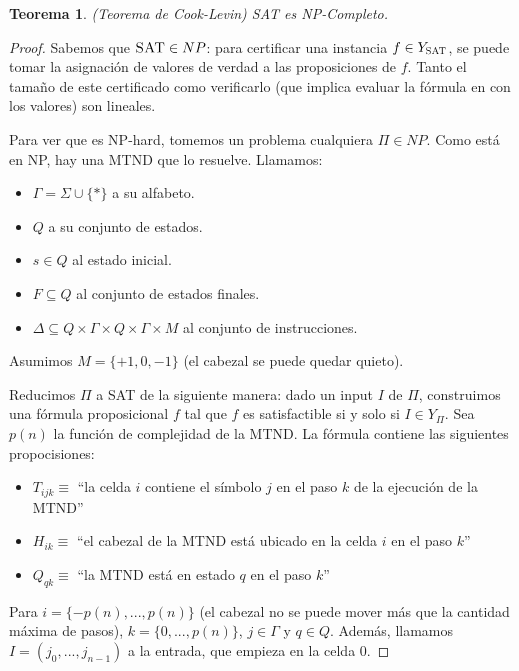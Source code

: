 \documentclass[a4paper]{report}
\newtheorem*{theorem*}{Teorema}
\begin{document}
\begin{theorem*}
    (Teorema de Cook-Levin) SAT es NP-Completo.
\end{theorem*}
\begin{proof}
    Sabemos que $\textsc{SAT} \in NP$: para certificar una instancia $f \in Y_{\textsc{SAT}}$, se puede tomar la asignación de valores de verdad a las proposiciones de $f$. Tanto el tamaño de este certificado como verificarlo (que implica evaluar la fórmula en con los valores) son lineales.

    Para ver que es NP-hard, tomemos un problema cualquiera $\Pi \in NP$. Como está en NP, hay una MTND que lo resuelve. Llamamos:
    \begin{itemize}
        \item $\Gamma = \Sigma \cup \{\ast\}$ a su alfabeto.
        \item $Q$ a su conjunto de estados.
        \item $s \in Q$ al estado inicial.
        \item $F \subseteq Q$ al conjunto de estados finales.
        \item $\Delta \subseteq Q \times \Gamma \times Q \times \Gamma \times M$ al conjunto de instrucciones.
    \end{itemize}

    Asumimos $M = \{+1, 0, -1\}$ (el cabezal se puede quedar quieto).

    Reducimos $\Pi$ a SAT de la siguiente manera: dado un input $I$ de $\Pi$, construimos una fórmula proposicional $f$ tal que $f$ es satisfactible si y solo si $I \in Y_{\Pi}$. Sea $p(n)$ la función de complejidad de la MTND. La fórmula contiene las siguientes propocisiones:
    \begin{itemize}
        \item $T_{ijk} \equiv $ ``la celda $i$ contiene el símbolo $j$ en el paso $k$ de la ejecución de la MTND''
        \item $H_{ik} \equiv $ ``el cabezal de la MTND está ubicado en la celda $i$ en el paso $k$''
        \item $Q_{qk} \equiv $ ``la MTND está en estado $q$ en el paso $k$''
    \end{itemize}

    Para $i = \{-p(n), ..., p(n)\}$ (el cabezal no se puede mover más que la cantidad máxima de pasos), $k = \{0, ..., p(n)\}$, $j \in \Gamma$ y $q \in Q$. Además, llamamos $I = (j_0, ..., j_{n - 1})$ a la entrada, que empieza en la celda $0$.


\end{proof}
\end{document}
